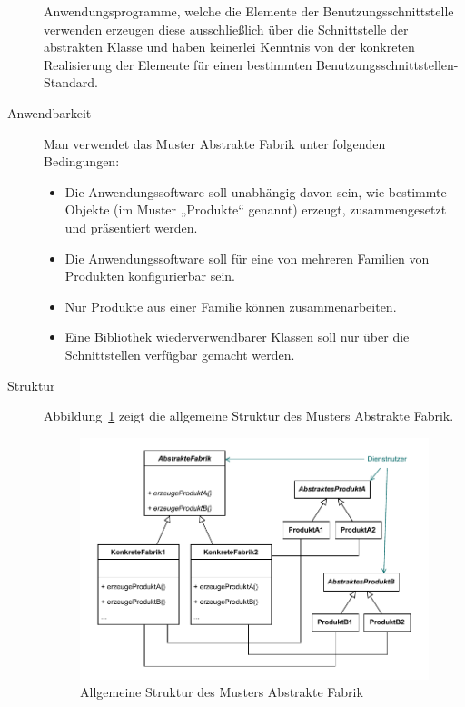\begin{description}
	Anwendungsprogramme, welche die Elemente der Benutzungsschnittstelle verwenden erzeugen diese ausschließlich über die Schnittstelle der abstrakten Klasse und haben keinerlei Kenntnis von der konkreten Realisierung der Elemente für einen bestimmten Benutzungsschnittstellen-Standard.
	\item[Anwendbarkeit] Man verwendet das Muster Abstrakte Fabrik unter folgenden
	\linebreak %
	Bedingungen:
	\begin{itemize}
		\item 	Die Anwendungssoftware soll unabhängig davon sein, wie bestimmte 
		\linebreak %
		Objekte (im Muster „Produkte“ genannt) erzeugt, zusammengesetzt und präsentiert werden.
		\item 	Die Anwendungssoftware soll für eine von mehreren Familien von Produkten konfigurierbar sein.
		\item 	Nur Produkte aus einer Familie können zusammenarbeiten.
		\item 	Eine Bibliothek wiederverwendbarer Klassen soll nur über die Schnittstellen verfügbar gemacht werden.
	\end{itemize}
	
	\item[Struktur] Abbildung~\ref{fig:muster_abstrakte_fabrik} zeigt die allgemeine Struktur des Musters Abstrakte
	\linebreak %
	Fabrik.
	
	\begin{figure}[h!]
		\centering
		\includegraphics[scale=1.0]{Bilder/Kapitel-10/muster_abstrakte_fabrik.pdf}
		\caption{Allgemeine Struktur des Musters Abstrakte Fabrik}
		\label{fig:muster_abstrakte_fabrik}
	\end{figure}	
	

\end{description}
